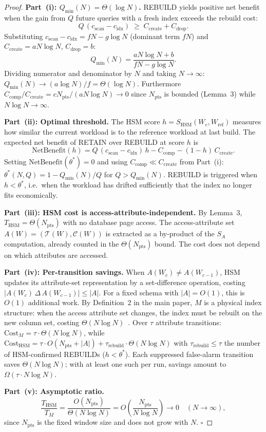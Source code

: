 \documentclass[10pt,twocolumn,a4paper]{article}
\newcommand{\SHSM}{S_{\mathrm{HSM}}}
\newcommand{\SA}{S_{A}}
\newcommand{\Npts}{N_{\mathrm{pts}}}
\newcommand{\thetastar}{\theta^{*}}
\begin{document}
\begin{proof}
\textbf{Part~(i): $Q_{\min}(N)=\Theta(\log N)$.}
REBUILD yields positive net benefit when the gain from $Q$ future
queries with a fresh index exceeds the rebuild cost:
\[
  Q\,(c_{\mathrm{scan}}-c_{\mathrm{idx}})\;\geq\;
  C_{\mathrm{create}}+C_{\mathrm{drop}}.
\]
Substituting $c_{\mathrm{scan}}-c_{\mathrm{idx}}=fN-g\log N$
(dominant term $fN$) and $C_{\mathrm{create}}=aN\log N$, $C_{\mathrm{drop}}=b$:
\[
  Q_{\min}(N)=\frac{aN\log N+b}{fN-g\log N}.
\]
Dividing numerator and denominator by $N$ and taking $N\to\infty$:
$Q_{\min}(N)\to(a\log N)/f=\Theta(\log N)$. Furthermore
$C_{\mathrm{comp}}/C_{\mathrm{create}}=c\Npts/(aN\log N)\to0$ since
$\Npts$ is bounded (Lemma~3) while $N\log N\to\infty$.

\textbf{Part~(ii): Optimal threshold.}
The HSM score $h=\SHSM(W_c,W_{\mathrm{ref}})$ measures how similar
the current workload is to the reference workload at last build. The
expected net benefit of RETAIN over REBUILD at score $h$ is
\[
  \mathrm{NetBenefit}(h)=Q\,(c_{\mathrm{scan}}-c_{\mathrm{idx}})\,h
  -C_{\mathrm{comp}}-(1-h)\,C_{\mathrm{create}}.
\]
Setting $\mathrm{NetBenefit}(\thetastar)=0$ and using
$C_{\mathrm{comp}}\!\ll\!C_{\mathrm{create}}$ from Part~(i):
$\thetastar(N,Q)=1-Q_{\min}(N)/Q$ for $Q>Q_{\min}(N)$. REBUILD is
triggered when $h<\thetastar$, i.e.\ when the workload has drifted
sufficiently that the index no longer fits economically.

\textbf{Part~(iii): HSM cost is access-attribute-independent.}
By Lemma~3, $T_{\mathrm{HSM}}=\Theta(\Npts)$ with no database page
access. The access-attribute set $A(W)=(\mathcal{T}(W),\mathcal{C}(W))$
is extracted as a by-product of the $\SA$ computation, already counted
in the $\Theta(\Npts)$ bound. The cost does not depend on which
attributes are accessed.

\textbf{Part~(iv): Per-transition savings.}
When $A(W_c)\neq A(W_{c-1})$, HSM updates its attribute-set
representation by a set-difference operation, costing
$|A(W_c)\,\Delta\,A(W_{c-1})|\leq|A|$. For a fixed schema with
$|A|=O(1)$, this is $O(1)$ additional work. By Definition~2 in the
main paper, $M$ is a physical index structure: when the access
attribute set changes, the index must be rebuilt on the new column
set, costing $\Theta(N\log N)$~\cite{Ramakrishnan2003DMS}. Over
$\tau$ attribute transitions:
$\mathrm{Cost}_{M}=\tau\cdot\Theta(N\log N)$, while
$\mathrm{Cost}_{\mathrm{HSM}}=\tau\cdot O(\Npts+|A|)+
 \tau_{\mathrm{rebuild}}\cdot\Theta(N\log N)$
with $\tau_{\mathrm{rebuild}}\leq\tau$ the number of HSM-confirmed
REBUILDs ($h<\thetastar$). Each suppressed false-alarm transition
saves $\Theta(N\log N)$; with at least one such per run, savings
amount to $\Omega(\tau\cdot N\log N)$.

\textbf{Part~(v): Asymptotic ratio.}
\[
  \frac{T_{\mathrm{HSM}}}{T_{M}}
  =\frac{O(\Npts)}{\Theta(N\log N)}
  =O\!\left(\frac{\Npts}{N\log N}\right)\to 0
  \quad(N\to\infty),
\]
since $\Npts$ is the fixed window size and does not grow with $N$.
\hfill$\square$
\end{proof}
\end{document}
